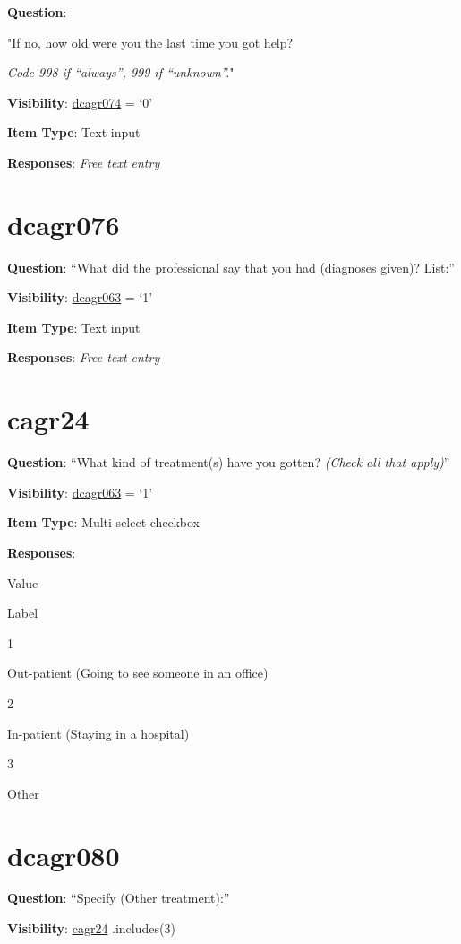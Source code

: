 \documentclass[]{book}
\begin{document}
\textbf{Question}:

"If no, how old were you the last time you got help?

\emph{Code 998 if ``always'', 999 if ``unknown''.}"

\textbf{Visibility}: \protect\hyperlink{dcagr074}{dcagr074} = `0'

\textbf{Item Type}: Text input

\textbf{Responses}: \emph{Free text entry}

\hypertarget{dcagr076}{%
\section{dcagr076}\label{dcagr076}}

\textbf{Question}: ``What did the professional say that you had (diagnoses given)? List:''

\textbf{Visibility}: \protect\hyperlink{dcagr063}{dcagr063} = `1'

\textbf{Item Type}: Text input

\textbf{Responses}: \emph{Free text entry}

\hypertarget{cagr24}{%
\section{cagr24}\label{cagr24}}

\textbf{Question}: ``What kind of treatment(s) have you gotten? \emph{(Check all that apply)}''

\textbf{Visibility}: \protect\hyperlink{dcagr063}{dcagr063} = `1'

\textbf{Item Type}: Multi-select checkbox

\textbf{Responses}:

Value

Label

1

Out-patient (Going to see someone in an office)

2

In-patient (Staying in a hospital)

3

Other

\hypertarget{dcagr080}{%
\section{dcagr080}\label{dcagr080}}

\textbf{Question}: ``Specify (Other treatment):''

\textbf{Visibility}: \protect\hyperlink{cagr24}{cagr24} .includes(3)
\end{document}
